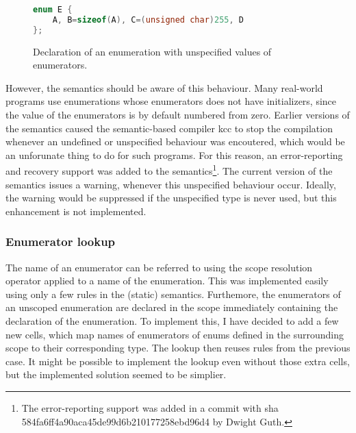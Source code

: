 \documentclass{fithesis3}
\begin{document}
\begin{figure}[h]
\begin{lstlisting}[language=C++]
enum E {
	A, B=sizeof(A), C=(unsigned char)255, D
};
\end{lstlisting}
\caption{Declaration of an enumeration with unspecified values of enumerators.}
\label{fig:ugly-enum}
\end{figure}

However, the semantics should be aware of this behaviour. Many real-world programs use enumerations whose enumerators does not have initializers, since the value of the enumerators is by default numbered from zero. Earlier versions of the semantics caused the semantic-based compiler kcc to stop the compilation whenever an undefined or unspecified behaviour was encoutered, which would be an unforunate thing to do for such programs. For this reason, an error-reporting and recovery support was added to the semantics\footnote{The error-reporting support was added in a commit with sha 584fa6ff4a90aca45de99d6b210177258ebd96d4 by Dwight Guth.}. The current version of the semantics issues a warning, whenever this unspecified behaviour occur. Ideally, the warning would be suppressed if the unspecified type is never used, but this enhancement is not implemented.



\subsubsection{Enumerator lookup}

The name of an enumerator can be referred to using the scope resolution operator applied to a name of the enumeration. This was implemented easily using only a few rules in the (static) semantics.
Furthemore, the enumerators of an unscoped enumeration are declared in the scope immediately containing the declaration of the enumeration. To implement this, I have decided to add a few new cells, which map names of enumerators of enums defined in the surrounding scope to their corresponding type. The lookup then reuses rules from the previous case. It might be possible to implement the lookup even without those extra cells, but the implemented solution seemed to be simplier.
\end{document}
